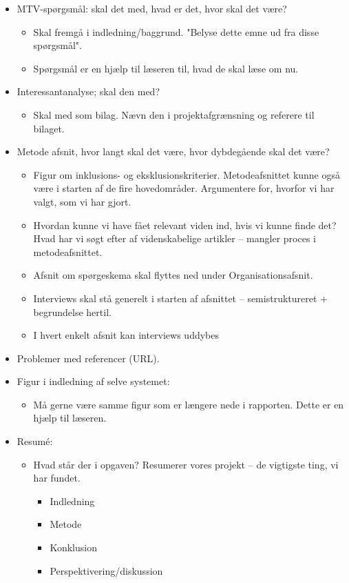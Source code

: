 \begin{itemize}
\item MTV-spørgsmål: skal det med, hvad er det, hvor skal det være?
\begin{itemize}
\item Skal fremgå i indledning/baggrund. "Belyse dette emne ud fra disse spørgsmål".
\item Spørgsmål er en hjælp til læseren til, hvad de skal læse om nu. 
\end{itemize}
\item Interessantanalyse; skal den med?
\begin{itemize}
\item Skal med som bilag. Nævn den i projektafgrænsning og referere til bilaget. 
\end{itemize}
\item Metode afsnit, hvor langt skal det være, hvor dybdegående skal det være?
\begin{itemize}
\item Figur om inklusions- og eksklusionskriterier. Metodeafsnittet kunne også være i starten af de fire hovedområder. Argumentere for, hvorfor vi har valgt, som vi har gjort. 
\item Hvordan kunne vi have fået relevant viden ind, hvis vi kunne finde det? Hvad har vi søgt efter af videnskabelige artikler – mangler proces i metodeafsnittet. 
\item Afsnit om spørgeskema skal flyttes ned under Organisationsafsnit. 
\item Interviews skal stå generelt i starten af afsnittet – semistruktureret + begrundelse hertil. 
\item I hvert enkelt afsnit kan interviews uddybes
\end{itemize}
\end{itemize}
\begin{itemize}
\item Problemer med referencer (URL).
\item Figur i indledning af selve systemet:
\begin{itemize}
\item Må gerne være samme figur som er længere nede i rapporten. Dette er en hjælp til læseren. 
\end{itemize}
\item Resumé:
\begin{itemize}
\item Hvad står der i opgaven? Resumerer vores projekt – de vigtigste ting, vi har fundet. 
\begin{itemize}
\item Indledning
\item Metode
\item Konklusion 
\item Perspektivering/diskussion
\end{itemize}
\end{itemize}
\end{itemize}

\newpage


